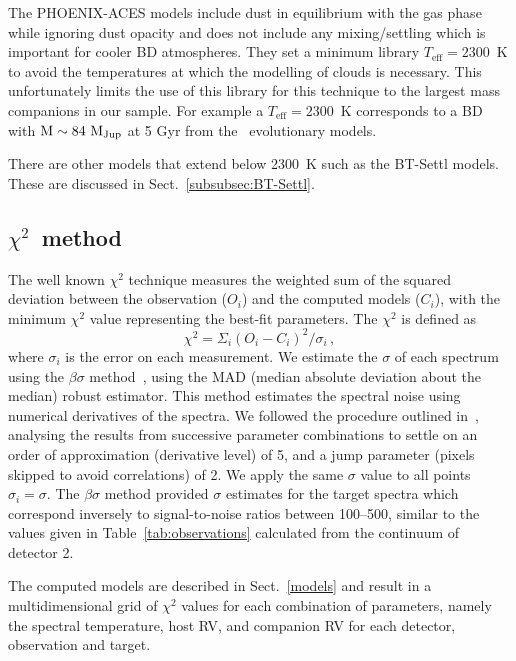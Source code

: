 \documentclass[fleqn,usenatbib]{mnras}
\begin{document}
The PHOENIX-ACES models include dust in equilibrium with the gas phase while ignoring dust opacity and does not include any mixing/settling which is important for cooler BD atmospheres. They set a minimum library \(T_{\textrm{eff}}=2300\)~K to avoid the temperatures at which the modelling of clouds is necessary. This unfortunately limits the use of this library for this technique to the largest mass companions in our sample. For example a \(T_{\textrm{eff}}=2300\)~K corresponds to a BD with \(\rm M\sim84~M_{Jup}\) at 5 Gyr from the~\citet{baraffe_evolutionary_2003} evolutionary models.

There are other models that extend below 2300~K such as the {BT-Settl} models\citep{allard_btsettl_2013,baraffe_new_2015}. These are discussed in Sect.~\ref{subsubsec:BT-Settl}.

\subsection{\texorpdfstring{\(\chi^{2}\)}\ \ method}
\label{subsec:chi2}
The well known \(\chi^{2}\) technique measures the weighted sum of the squared deviation between the observation (\({O}_{i}\)) and the computed models (\(C_{i}\)), with the minimum \(\chi^2\) value representing the best-fit parameters. The \(\chi^{2}\) is defined as
\begin{equation}
\chi^{2} = {\Sigma}_i { (O_{i} - C_{i})}^2 / {\sigma}_{i}\,,
\end{equation}
  where \({\sigma}_{i}\) is the error on each measurement. We estimate the \(\sigma\) of each spectrum using the \(\beta\sigma\) method~\citep{czesla_posteriori_2018}, using the MAD (median absolute deviation about the median) robust estimator. {This method estimates the spectral noise using numerical derivatives of the spectra. We followed the procedure outlined in~\citet{czesla_posteriori_2018}, analysing the results from successive parameter combinations to settle on an order of approximation (derivative level) of 5, and a jump parameter (pixels skipped to avoid correlations) of 2.} We apply the same \(\sigma\) value to all points \({\sigma}_{i} = \sigma\). The \(\beta\sigma\) method provided \(\sigma\) estimates for the target spectra which correspond inversely to signal-to-noise ratios between 100--500, {similar to the values given in Table~\ref{tab:observations} calculated from the continuum of detector 2.}

The computed models are described in Sect.~\ref{models} and result in a multidimensional grid of \(\chi^2\) values for each combination of parameters, namely the spectral temperature, host RV, and companion RV for each detector, observation and target.
\end{document}
